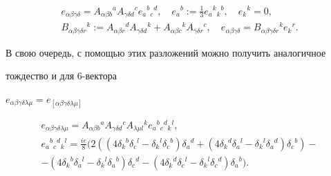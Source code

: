 \begin{equation}


\label{e6b}


\begin{array}{c}


e_{\alpha\beta\gamma\delta}=A_{\alpha\beta b}{}^{a}


A_{\gamma\delta d}{}^{c} e_a{}^b{}_c{}^d,\quad


e_a{}^b:=\frac{1}{3}e_a{}^k{}_k{}^b,\quad e_k{}^k=0, \\[2mm]


B_{\alpha\beta\gamma\delta r}{}^k:=


A_{\alpha\beta r}{}^d A_{\gamma\delta d}{}^k+


A_{\alpha\beta c}{}^k A_{\gamma\delta r}{}^c,\quad


e_{\alpha\beta\gamma\delta}=B_{\alpha\beta\gamma\delta r}{}^k e_k{}^r.


\end{array}


\end{equation}


В свою очередь, с помощью этих разложений можно получить аналогичное


тождество и для 6-вектора


$e_{\alpha\beta\gamma\delta\lambda\mu}=


e_{[\alpha\beta\gamma\delta\lambda\mu]}$


\begin{gather*}


\label{e7b}


e_{\alpha\beta\gamma\delta\lambda\mu}=


A_{\alpha\beta b}{}^aA_{\gamma\delta d}{}^c


A_{\lambda\mu l}{}^k e_a{}^b{}_c{}^d{}_k{}^l, \\


%


e_a{}^b{}_c{}^d{}_k{}^l=\frac{ie}{8}


(2((4\delta_k{}^b\delta_c{}^l-\delta_k{}^l\delta_c{}^b)\delta_a{}^d


+(4\delta_k{}^d\delta_a{}^l-\delta_k{}^l\delta_a{}^d)\delta_c{}^b)-\\


%


-(4\delta_k{}^b\delta_a{}^l-\delta_k{}^l\delta_a{}^b)\delta_c{}^d-


(4\delta_k{}^d\delta_c{}^l-\delta_k{}^l\delta_c{}^d)\delta_a{}^b).


\end{gather*}





